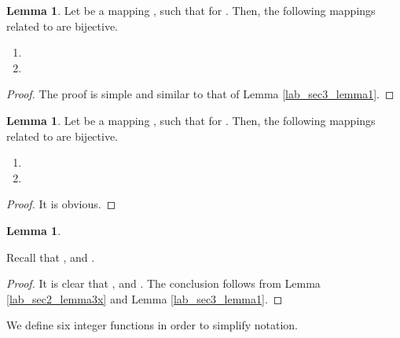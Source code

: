 \documentclass{mcom-l}
\theoremstyle{definition}
\newtheorem{sec3lemma2}[sec3lemma1]{Lemma}
\newtheorem{sec3lemma3}[sec3lemma1]{Lemma}
\newtheorem{sec3lemma4}[sec3lemma1]{Lemma}
\numberwithin{equation}{section}
\begin{document}
        \begin{sec3lemma2}\label{lab_sec3_lemma2}
          Let  be a mapping , such that for . Then, the following mappings related to  are bijective.
          \begin{enumerate} \item
          
          \item
          
          \end{enumerate}
          \end{sec3lemma2}
          \begin{proof}
          The proof is simple and similar to that of Lemma \ref{lab_sec3_lemma1}.
          \end{proof}
          \begin{sec3lemma3}\label{lab_sec3_lemma3}
          Let  be a mapping , such that for . Then, the following mappings related to  are bijective.
          \begin{enumerate} \item
          
          \item
          
          \end{enumerate}
          \end{sec3lemma3}
          \begin{proof}
          It is obvious.
          \end{proof}
          \begin{sec3lemma4}\label{lab_sec3_lemma4}
          
          Recall that , and .
          \end{sec3lemma4}
          \begin{proof}
          It is clear that , and . The conclusion follows from Lemma \ref{lab_sec2_lemma3x} and Lemma \ref{lab_sec3_lemma1}.
          \end{proof}
          
           We define six integer functions in order to simplify notation.
              
\end{document}
